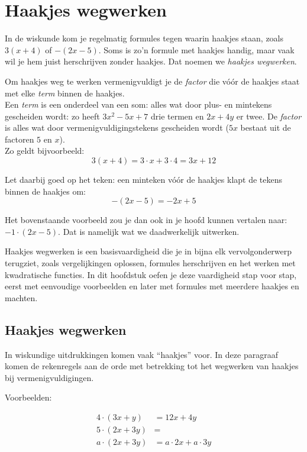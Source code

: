 \chapter{Haakjes wegwerken}
\label{chap:haakjes}

In de wiskunde kom je regelmatig formules tegen waarin haakjes staan, 
zoals $3(x+4)$ of $-(2x-5)$. Soms is zo'n formule met haakjes handig, 
maar vaak wil je hem juist herschrijven zonder haakjes. Dat noemen 
we \emph{haakjes wegwerken}.

Om haakjes weg te werken vermenigvuldigt je de \emph{factor} die v\'o\'or de haakjes staat met elke \emph{term} binnen de haakjes. \\ 
Een \emph{term} is een onderdeel van een som: alles wat door plus- en mintekens gescheiden wordt: zo heeft $3x^2 - 5x + 7$ drie termen en $2x+4y$ er twee. De \emph{factor} is alles wat door vermenigvuldigingstekens gescheiden wordt ($5x$ bestaat uit de 
factoren $5$ en $x$).\\

Zo geldt bijvoorbeeld:
\[
3(x+4) = 3\cdot x + 3\cdot 4 = 3x + 12
\]

Let daarbij goed op het teken: een minteken v\'o\'or de haakjes klapt de 
tekens binnen de haakjes om:
\[
-(2x-5) = -2x + 5
\]

Het bovenstaande voorbeeld zou je dan ook in je hoofd kunnen vertalen naar: $-1 \cdot (2x-5)$. Dat is namelijk wat we daadwerkelijk uitwerken.

Haakjes wegwerken is een basisvaardigheid die je in bijna elk vervolgonderwerp 
terugziet, zoals vergelijkingen oplossen, formules herschrijven en het 
werken met kwadratische functies. In dit hoofdstuk oefen je deze vaardigheid 
stap voor stap, eerst met eenvoudige voorbeelden en later met formules met 
meerdere haakjes en machten.

\section{Haakjes wegwerken}
In wiskundige uitdrukkingen komen vaak ``haakjes'' voor. In deze paragraaf komen de rekenregels aan de orde met betrekking tot het wegwerken van haakjes bij vermenigvuldigingen.


Voorbeelden:

\begin{align*}
4 \cdot (3x + y) &= 12x + 4y \\
5 \cdot (2x + 3y) &= \\
a \cdot (2x + 3y) &= a \cdot 2x + a \cdot 3y 
\end{align*}


